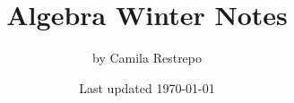 \documentclass{notes}
\title{\bfseries Algebra Winter Notes}
\author{by Camila Restrepo}
\date{Last updated \today}
\begin{document}
\maketitle
\toccontents
\frontpagewarning


\end{document}
